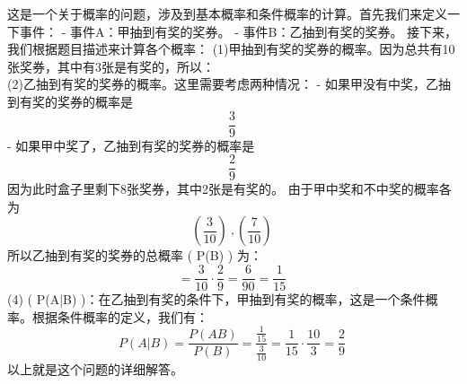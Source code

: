 
这是一个关于概率的问题，涉及到基本概率和条件概率的计算。首先我们来定义一下事件： - 事件A：甲抽到有奖的奖券。 - 事件B：乙抽到有奖的奖券。 接下来，我们根据题目描述来计算各个概率： (1)甲抽到有奖的奖券的概率。因为总共有10张奖券，其中有3张是有奖的，所以： \begin{equation}
[ P(A) = \frac{3}{10} ] ~
\end{equation}(2)乙抽到有奖的奖券的概率。这里需要考虑两种情况： - 如果甲没有中奖，乙抽到有奖的奖券的概率是
\begin{equation}
 \frac{3}{9}~
\end{equation}
 - 如果甲中奖了，乙抽到有奖的奖券的概率是 \begin{equation}
 \frac{2}{9}~
 \end{equation}因为此时盒子里剩下8张奖券，其中2张是有奖的。 由于甲中奖和不中奖的概率各为 \begin{equation}
 ( \frac{3}{10} )~,(\frac{7}{10})~
 \end{equation}所以乙抽到有奖的奖券的总概率 ( P(B) ) 为： \begin{equation}
 [ P(B) = P(A) \cdot P(B|A) + P(\overline{A}) \cdot P(B|\overline{A})~
 \end{equation}\begin{equation}
 = \frac{3}{10} \cdot \frac{2}{9} + \frac{7}{10} \cdot \frac{3}{9} = \frac{6}{90} + \frac{21}{90} = \frac{27}{90} = \frac{3}{10} ~
 \end{equation}(3)甲和乙都抽到有奖的奖券的概率。这可以通过甲抽到有奖的奖券，然后乙接着抽到有奖的奖券的概率来计算： \begin{equation}
  P(AB) = P(A) \cdot P(B|A) ]~
 \end{equation}
 \begin{equation}
 = \frac{3}{10} \cdot \frac{2}{9} = \frac{6}{90} = \frac{1}{15} ~
 \end{equation}
 (4) ( P(A|B) )：在乙抽到有奖的条件下，甲抽到有奖的概率，这是一个条件概率。根据条件概率的定义，我们有： \begin{equation}
  P(A|B) = \frac{P(AB)}{P(B)}  = \frac{\frac{1}{15}}{\frac{3}{10}}= \frac{1}{15} \cdot \frac{10}{3} = \frac{2}{9}  ~
 \end{equation}
 以上就是这个问题的详细解答。

